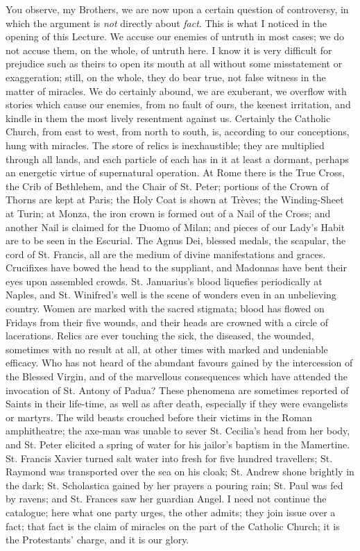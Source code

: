 You observe, my Brothers, we are now upon a certain
question of controversy, in which the argument is \emph{not}
directly about \emph{fact}. This is what I noticed in
the opening of this Lecture. We accuse our enemies of
untruth in most cases; we do not accuse them, on the
whole, of untruth here. I know it is very difficult for
prejudice such as theirs to open its mouth at all without
some misstatement or exaggeration; still, on the whole,
they do bear true, not false witness in the matter of
miracles. We do certainly abound, we are exuberant, we
overflow with stories which cause our enemies, from no
fault of ours, the keenest irritation, and kindle in them
the most lively resentment against us. Certainly the
Catholic Church, from east to west, from north to south,
is, according to our conceptions, hung with miracles. The
store of relics is inexhaustible; they are multiplied
through all lands, and each particle of each has in it at
least a dormant, perhaps an energetic virtue of
supernatural operation. At Rome there is the True Cross,
the Crib of Bethlehem, and the Chair of St. Peter;
portions of the Crown of Thorns are kept at Paris; the
Holy Coat is shown at Trèves; the Winding-Sheet at
Turin; at Monza, the iron crown is formed out of a Nail
of the Cross; and another Nail is claimed for the Duomo of Milan; and pieces of our Lady's Habit are to be seen
in the Escurial. The Agnus Dei, blessed medals, the
scapular, the cord of St. Francis, all are the medium of
divine manifestations and graces. Crucifixes have bowed
the head to the suppliant, and Madonnas have bent their
eyes upon assembled crowds. St. Januarius's blood
liquefies periodically at Naples, and St. Winifred's well
is the scene of wonders even in an unbelieving country.
Women are marked with the sacred stigmata; blood has
flowed on Fridays from their five wounds, and their heads
are crowned with a circle of lacerations. Relics are ever
touching the sick, the diseased, the wounded, sometimes
with no result at all, at other times with marked and
undeniable efficacy. Who has not heard of the abundant
favours gained by the intercession of the Blessed Virgin,
and of the marvellous consequences which have attended
the invocation of St. Antony of Padua? These phenomena
are sometimes reported of Saints in their life-time, as
well as after death, especially if they were evangelists
or martyrs. The wild beasts crouched before their victims
in the Roman amphitheatre; the axe-man was unable to
sever St. Cecilia's head from her body, and St. Peter
elicited a spring of water for his jailor's baptism in
the Mamertine. St. Francis Xavier turned salt water into
fresh for five hundred travellers; St. Raymond was
transported over the sea on his cloak; St. Andrew shone
brightly in the dark; St. Scholastica gained by her
prayers a pouring rain; St. Paul was fed by ravens; and
St. Frances saw her guardian Angel. I need not continue
the catalogue; here what one party urges, the other
admits; they join issue over a fact; that fact is the claim of miracles on the part of the Catholic Church; it
is the Protestants' charge, and it is our glory.


